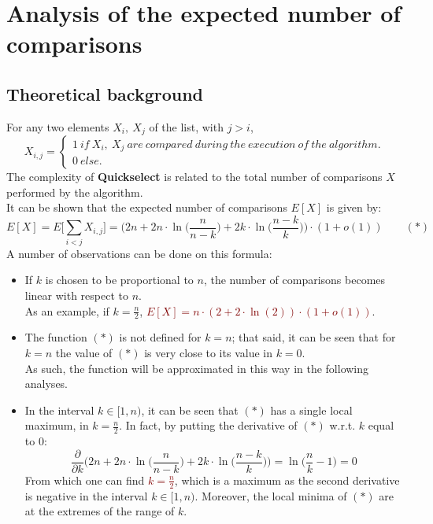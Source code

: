 \documentclass[
12pt,
a4paper,
oneside,
headinclude,
footinclude]{article}
\begin{document}
\section{Analysis of the expected number of comparisons}
\vspace{-5mm}
\subsection{Theoretical background}
\vspace{-5mm}
For any two elements $X_i,\ X_j$ of the list, with $j > i$, \\
\[
    X_{i,j} = \begin{cases}
                    1\ if\ X_i,\ X_j\ are\ compared\ during\ the\ execution\ of\ the\ algorithm. \\
                    0\ else.
                \end{cases}
\]
The complexity of \textbf{Quickselect} is related to the total number of comparisons $X$ performed by the algorithm.\\
It can be shown that the expected number of comparisons $E[X]$ is given by:
$$E[X] = E\Big[\sum_{i < j}{X_{i,j}}\Big] = \Big(2n + 2n \cdot\ln\Big(\frac{n}{n - k}\Big) + 2k \cdot\ln\Big(\frac{n - k}{k}\Big)\Big)\cdot (1 + o(1)) \quad\quad (\ast)$$
\vspace{-5mm}
A number of observations can be done on this formula:
\begin{itemize}
    \item If $k$ is chosen to be proportional to $n$, the number of comparisons becomes linear with respect to $n$.\\
    As an example, if $k = \frac{n}{2}$, \textcolor{Maroon}{$E[X] = n \cdot (2 + 2 \cdot \ln(2)) \cdot (1 + o(1))$}.

    \item The function $(\ast)$ is not defined for $k = n$; that said, it can be seen that for $k = n$ the value of $(\ast)$ is very close to its value in $k = 0$. \\
        As such, the function will be approximated in this way in the following analyses.

    \item In the interval $k \in [1, n)$, it can be seen that $(\ast)$ has a single local maximum, in $k = \frac{n}{2}$. In fact, by putting the derivative of $(\ast)$ w.r.t. $k$ equal to $0$: $$\frac{\partial}{\partial k}\Big(2n + 2n \cdot\ln\Big(\frac{n}{n - k}\Big) + 2k \cdot\ln\Big(\frac{n - k}{k}\Big)\Big) = \ln\Big(\frac{n}{k} - 1 \Big) = 0$$
    From which one can find \textcolor{Maroon}{$k = \frac{n}{2}$}, which is a maximum as the second derivative is negative in the interval $k \in [1, n)$.
    Moreover, the local minima of $(\ast)$ are at the extremes of the range of $k$.
\end{itemize}
\end{document}
